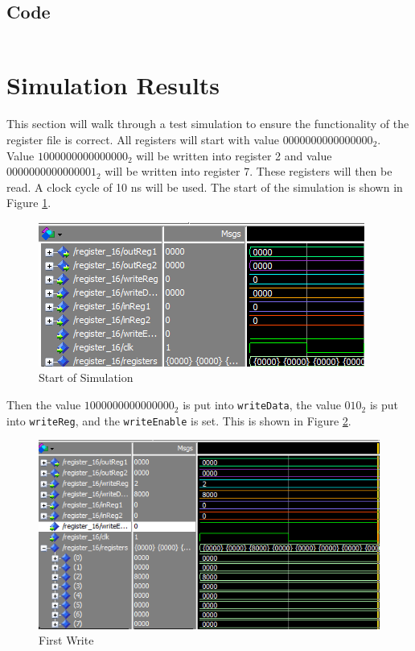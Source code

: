 \documentclass[12pt]{article}
\begin{document}
\subsection{Code}\label{sec:code}
\lstset{language=VHDL}

\begin{lstlisting}

\end{lstlisting}
\section{Simulation Results}
This section will walk through a test simulation to ensure the functionality of the register file is correct. All registers will start with value $0000000000000000_2$. Value $1000000000000000_2$ will be written into register 2 and value $0000000000000001_2$ will be written into register 7. These registers will then be read. A clock cycle of 10 ns will be used. The start of the simulation is shown in Figure \ref{fig:sim-start}.

\begin{figure}[H]
\centering
\includegraphics[width=\linewidth]{sim-start}
\caption{Start of Simulation}
\label{fig:sim-start}
\end{figure}

Then the value $1000000000000000_2$ is put into \texttt{writeData}, the value $010_2$ is put into \texttt{writeReg}, and the \texttt{writeEnable} is set. This is shown in Figure \ref{fig:write1}. 

\begin{figure}[H]
\centering
\includegraphics[width=1\linewidth]{write1}
\caption{First Write}
\label{fig:write1}
\end{figure}
\end{document}

